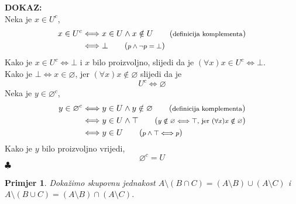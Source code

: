 \documentclass{article}
\newtheorem{primjer}{Primjer}
\newenvironment{dokaz}
    {\noindent\textbf{DOKAZ:}\\} {\hfill $\clubsuit$}
\begin{document}
\begin{dokaz}
    Neka je $x\in U^c$,
    \begin{align*}
        x\in U^c    &\Longleftrightarrow x\in U\land x\notin U          \tag{\textrm{\footnotesize definicija komplementa}}\\
                    &\Longleftrightarrow \bot                           \tag{\textrm{\footnotesize $p\land \lnot p=\bot$}}\\
    \end{align*}
    Kako je $x\in U^c\Longleftrightarrow\bot$ i $x$ bilo proizvoljno, slijedi da je $(\forall x)x\in U^c\Longleftrightarrow\bot.$\\
    Kako je $\bot\Longleftrightarrow x\in \varnothing$, jer $(\forall x)x\notin \varnothing$ slijedi da je
    $$U^c\Longleftrightarrow\varnothing$$
    Neka je $y\in\varnothing ^c$,
    \begin{align*}
        y\in\varnothing ^c  &\Longleftrightarrow y\in U \land y\notin\varnothing    \tag{\textrm{\footnotesize definicija komplementa}}\\
                            &\Longleftrightarrow y\in U\land\top                    \tag{\textrm{\footnotesize $y\notin\varnothing\Longleftrightarrow \top,$ jer $(\forall x)x\notin\varnothing$}}\\
                            &\Longleftrightarrow y\in U                             \tag{\textrm{\footnotesize $p\land \top\Longleftrightarrow p$}}\\
    \end{align*}
    Kako je $y$ bilo proizvoljno vrijedi,
    $$\varnothing ^c=U$$
\end{dokaz}

\begin{primjer}
    Dokažimo skupovnu jednakost $A\setminus (B\cap C)=(A\setminus B)\cup (A\setminus C)$ i $A\setminus (B\cup C)=(A\setminus B)\cap (A\setminus C)$.
\end{primjer}
\end{document}
